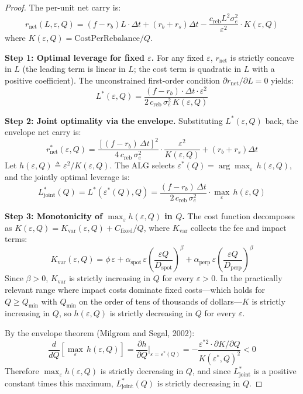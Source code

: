 \documentclass[11pt]{article}
\begin{document}
\begin{proof}
The per-unit net carry is:
\begin{equation}
r_{\text{net}}(L, \varepsilon, Q) = (f - r_b) L \cdot \Delta t + (r_b + r_s) \Delta t - \frac{c_{\text{reb}} L^2 \sigma_e^2}{\varepsilon^2} \cdot K(\varepsilon, Q)
\end{equation}
where $K(\varepsilon, Q) = \text{CostPerRebalance}/Q$.

\textbf{Step 1: Optimal leverage for fixed $\varepsilon$.}
For any fixed $\varepsilon$, $r_{\text{net}}$ is strictly concave in $L$ (the leading term is linear in $L$; the cost term is quadratic in $L$ with a positive coefficient). The unconstrained first-order condition $\partial r_{\text{net}} / \partial L = 0$ yields:
\begin{equation}
L^*(\varepsilon, Q) = \frac{(f - r_b) \cdot \Delta t \cdot \varepsilon^2}{2 \, c_{\text{reb}} \, \sigma_e^2 \, K(\varepsilon, Q)}
\end{equation}

\textbf{Step 2: Joint optimality via the envelope.}
Substituting $L^*(\varepsilon, Q)$ back, the envelope net carry is:
\begin{equation}
r_{\text{net}}^*(\varepsilon, Q) = \frac{[(f - r_b) \, \Delta t]^2}{4 \, c_{\text{reb}} \, \sigma_e^2} \cdot \frac{\varepsilon^2}{K(\varepsilon, Q)} + (r_b + r_s)\Delta t
\label{eq:envelope}
\end{equation}
Let $h(\varepsilon, Q) \triangleq \varepsilon^2 / K(\varepsilon, Q)$. The ALG selects $\varepsilon^*(Q) = \arg\max_\varepsilon \, h(\varepsilon, Q)$, and the jointly optimal leverage is:
\[
L_{\text{joint}}^*(Q) = L^*(\varepsilon^*(Q), Q) = \frac{(f - r_b)\,\Delta t}{2\,c_{\text{reb}}\,\sigma_e^2} \cdot \max_\varepsilon \, h(\varepsilon, Q)
\]

\textbf{Step 3: Monotonicity of $\max_\varepsilon h(\varepsilon, Q)$ in $Q$.}
The cost function decomposes as $K(\varepsilon, Q) = K_{\text{var}}(\varepsilon, Q) + C_{\text{fixed}}/Q$, where $K_{\text{var}}$ collects the fee and impact terms:
\[
K_{\text{var}}(\varepsilon, Q) = \phi\,\varepsilon + \alpha_{\text{spot}}\,\varepsilon\!\left(\frac{\varepsilon Q}{D_{\text{spot}}}\right)^{\!\beta} + \alpha_{\text{perp}}\,\varepsilon\!\left(\frac{\varepsilon Q}{D_{\text{perp}}}\right)^{\!\beta}
\]
Since $\beta > 0$, $K_{\text{var}}$ is strictly increasing in $Q$ for every $\varepsilon > 0$. In the practically relevant range where impact costs dominate fixed costs---which holds for $Q \geq Q_{\min}$ with $Q_{\min}$ on the order of tens of thousands of dollars---$K$ is strictly increasing in $Q$, so $h(\varepsilon, Q)$ is strictly decreasing in $Q$ for every $\varepsilon$.

By the envelope theorem (Milgrom and Segal, 2002):
\[
\frac{d}{dQ}\!\left[\max_\varepsilon\, h(\varepsilon, Q)\right] = \frac{\partial h}{\partial Q}\bigg|_{\varepsilon = \varepsilon^*(Q)} = -\frac{\varepsilon^{*2} \cdot \partial K / \partial Q}{K(\varepsilon^*, Q)^2} < 0
\]
Therefore $\max_\varepsilon h(\varepsilon, Q)$ is strictly decreasing in $Q$, and since $L_{\text{joint}}^*$ is a positive constant times this maximum, $L_{\text{joint}}^*(Q)$ is strictly decreasing in $Q$.
\end{proof}
\end{document}

